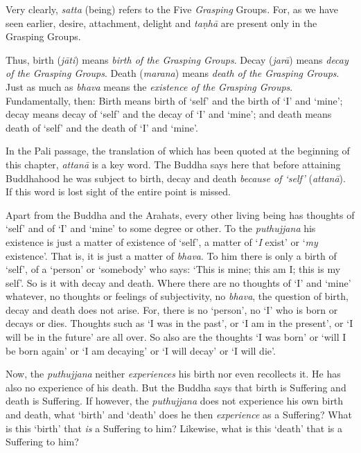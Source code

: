 Very clearly, \textit{satta} (being) refers to the Five \textit{Grasping} Groups. For, as we have seen earlier, desire, attachment, delight and \textit{taṇhā} are present only in the Grasping Groups.

Thus, birth (\textit{jāti}) means \emph{birth of the Grasping Groups}. Decay (\textit{jarā}) means \emph{decay of the Grasping Groups}. Death (\textit{marana}) means \emph{death of the Grasping Groups}. Just as much as \textit{bhava} means the \emph{existence of the Grasping Groups}. Fundamentally, then: Birth means birth of `self' and the birth of `I' and `mine'; decay means decay of `self' and the decay of `I' and `mine'; and death means death of `self' and the death of `I' and `mine'.

In the Pali passage, the translation of which has been quoted at the beginning of this chapter, \textit{attanā} is a key word. The Buddha says here that before attaining Buddhahood he was subject to birth, decay and death \emph{because of `self'} (\textit{attanā}). If this word is lost sight of the entire point is missed.

Apart from the Buddha and the Arahats, every other living being has thoughts of `self' and of `I' and `mine' to some degree or other. To the \textit{puthujjana} his existence is just a matter of existence of `self', a matter of `\emph{I} exist' or `\emph{my} existence'. That is, it is just a matter of \textit{bhava}. To him there is only a birth of `self', of a `person' or `somebody' who says: `This is mine; this am I; this is my self'. So is it with decay and death. Where there are no thoughts of `I' and `mine' whatever, no thoughts or feelings of subjectivity, no \textit{bhava}, the question of birth, decay and death does not arise. For, there is no `person', no `I' who is born or decays or dies. Thoughts such as `I was in the past', or `I am in the present', or `I will be in the future' are all over. So also are the thoughts `I was born' or `will I be born again' or `I am decaying' or `I will decay' or `I will die'.

Now, the \textit{puthujjana} neither \emph{experiences} his birth nor even recollects it. He has also no experience of his death. But the Buddha says that birth is Suffering and death is Suffering. If however, the \textit{puthujjana} does not experience his own birth and death, what `birth' and `death' does he then \emph{experience} as a Suffering? What is this `birth' that \emph{is} a Suffering to him? Likewise, what is this `death' that is a Suffering to him?

